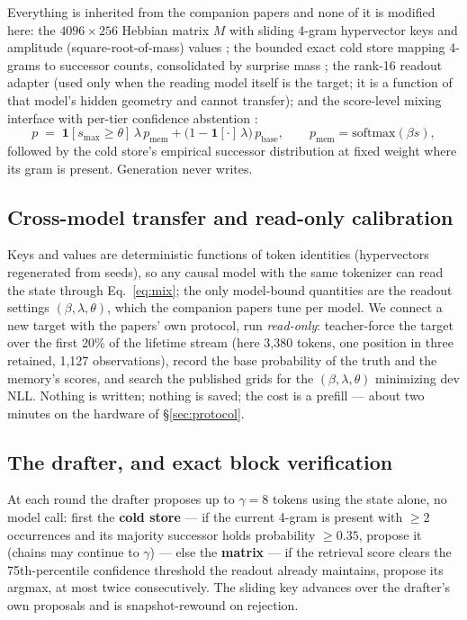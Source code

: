 \documentclass[11pt]{article}
\begin{document}
Everything is inherited from the companion papers and none of it is modified here: the $4096 \times 256$ Hebbian matrix $M$ with sliding 4-gram hypervector keys and amplitude (square-root-of-mass) values \cite{sillage}; the bounded exact cold store mapping 4-grams to successor counts, consolidated by surprise mass \cite{hier}; the rank-16 readout adapter \cite{fw} (used only when the reading model itself is the target; it is a function of that model's hidden geometry and cannot transfer); and the score-level mixing interface with per-tier confidence abstention \cite{router}:
\begin{equation}
p \;=\; \mathbf{1}[s_{\max} \ge \theta]\,\lambda\, p_{\mathrm{mem}} + \bigl(1 - \mathbf{1}[\cdot]\,\lambda\bigr)\, p_{\mathrm{base}},
\qquad p_{\mathrm{mem}} = \mathrm{softmax}(\beta s),
\label{eq:mix}
\end{equation}
followed by the cold store's empirical successor distribution at fixed weight where its gram is present. Generation never writes.

\subsection{Cross-model transfer and read-only calibration}\label{sec:transfermethod}

Keys and values are deterministic functions of token identities (hypervectors regenerated from seeds), so any causal model with the same tokenizer can read the state through Eq.~\eqref{eq:mix}; the only model-bound quantities are the readout settings $(\beta, \lambda, \theta)$, which the companion papers tune per model. We connect a new target with the papers' own protocol, run \emph{read-only}: teacher-force the target over the first 20\% of the lifetime stream (here 3{,}380 tokens, one position in three retained, 1{,}127 observations), record the base probability of the truth and the memory's scores, and search the published grids for the $(\beta, \lambda, \theta)$ minimizing dev NLL. Nothing is written; nothing is saved; the cost is a prefill --- about two minutes on the hardware of \S\ref{sec:protocol}.

\subsection{The drafter, and exact block verification}\label{sec:draftermethod}

At each round the drafter proposes up to $\gamma = 8$ tokens using the state alone, no model call: first the \textbf{cold store} --- if the current 4-gram is present with $\ge 2$ occurrences and its majority successor holds probability $\ge 0.35$, propose it (chains may continue to $\gamma$) --- else the \textbf{matrix} --- if the retrieval score clears the 75th-percentile confidence threshold the readout already maintains, propose its argmax, at most twice consecutively. The sliding key advances over the drafter's own proposals and is snapshot-rewound on rejection.
\end{document}
